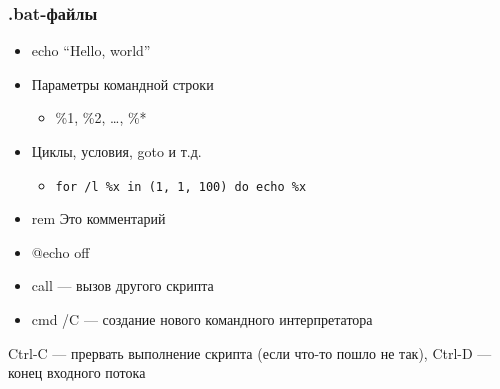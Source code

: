 \documentclass[xetex,mathserif,serif]{beamer}
\begin{document}
    \begin{frame}[fragile]
        \frametitle{.bat-файлы}
        \begin{itemize}
            \item echo ``Hello, world''
            \item Параметры командной строки
            \begin{itemize}
                \item  \%1, \%2, …, \%*
            \end{itemize}
            \item Циклы, условия, goto и т.д.
            \begin{itemize}
                \item 
                    \begin{footnotesize}
                        \begin{verbatim}
for /l %x in (1, 1, 100) do echo %x
                        \end{verbatim}
                    \end{footnotesize}
            \end{itemize}
            \item rem Это комментарий
            \item @echo off
            \item call --- вызов другого скрипта
            \item cmd /C --- создание нового командного интерпретатора
        \end{itemize}
        Ctrl-C --- прервать выполнение скрипта (если что-то пошло не так), Ctrl-D --- конец входного потока
    \end{frame}
\end{document}
